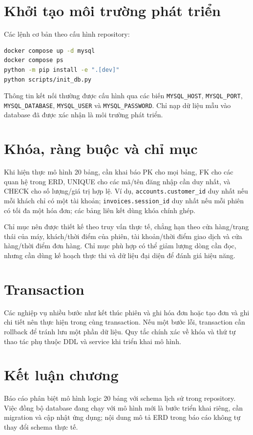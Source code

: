 \section{Khởi tạo môi trường phát triển}
Các lệnh cơ bản theo cấu hình repository:
\begin{lstlisting}[language=bash]
docker compose up -d mysql
docker compose ps
python -m pip install -e ".[dev]"
python scripts/init_db.py
\end{lstlisting}

Thông tin kết nối thường được cấu hình qua các biến \texttt{MYSQL\_HOST}, \texttt{MYSQL\_PORT}, \texttt{MYSQL\_DATABASE}, \texttt{MYSQL\_USER} và \texttt{MYSQL\_PASSWORD}. Chỉ nạp dữ liệu mẫu vào database đã được xác nhận là môi trường phát triển.

\section{Khóa, ràng buộc và chỉ mục}
Khi hiện thực mô hình 20 bảng, cần khai báo PK cho mọi bảng, FK cho các quan hệ trong ERD, UNIQUE cho các mã/tên đăng nhập cần duy nhất, và CHECK cho số lượng/giá trị hợp lệ. Ví dụ, \texttt{accounts.customer\_id} duy nhất nếu mỗi khách chỉ có một tài khoản; \texttt{invoices.session\_id} duy nhất nếu mỗi phiên có tối đa một hóa đơn; các bảng liên kết dùng khóa chính ghép.

Chỉ mục nên được thiết kế theo truy vấn thực tế, chẳng hạn theo cửa hàng/trạng thái của máy, khách/thời điểm của phiên, tài khoản/thời điểm giao dịch và cửa hàng/thời điểm đơn hàng. Chỉ mục phù hợp có thể giảm lượng dòng cần đọc, nhưng cần dùng kế hoạch thực thi và dữ liệu đại diện để đánh giá hiệu năng.

\section{Transaction}
Các nghiệp vụ nhiều bước như kết thúc phiên và ghi hóa đơn hoặc tạo đơn và ghi chi tiết nên thực hiện trong cùng transaction. Nếu một bước lỗi, transaction cần rollback để tránh lưu một phần dữ liệu. Quy tắc chính xác về khóa và thứ tự thao tác phụ thuộc DDL và service khi triển khai mô hình.

\section{Kết luận chương}
Báo cáo phân biệt mô hình logic 20 bảng với schema lịch sử trong repository. Việc đồng bộ database đang chạy với mô hình mới là bước triển khai riêng, cần migration và cập nhật ứng dụng; nội dung mô tả ERD trong báo cáo không tự thay đổi schema thực tế.
